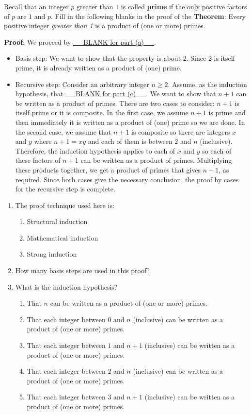 
Recall that an integer $p$ greater than $1$ is called {\bf prime} if the only positive factors of 
$p$ are $1$ and $p$. Fill in the following blanks in the proof of the {\bf Theorem}: 
Every positive integer {\it greater than 1} is a product of (one or more) primes.

{\bf Proof}: We proceed by \underline{~~~BLANK for part (a)~~~}.
\begin{itemize}
\item[] Basis step: We want to show that the property is about $2$. Since $2$ is itself prime,
it is already written as a product of (one) prime.
\item[] Recursive step: Consider an arbitrary integer $n \geq 2$.  Assume, as the induction hypothesis,
that \underline{~~~BLANK for part (c)~~~}. We want to show that $n+1$ can be written 
as a product of primes.  There are two cases to consider: $n+1$ is itself prime or it is composite.
In the first case, we assume $n+1$ is prime and then immediately it is written as a product
of (one) prime so we are done.  In the second case, we assume that $n+1$ is composite
so there are integers $x$ and $y$ where $n+1 = xy$ and each of them is between $2$ and $n$
(inclusive).  Therefore, the induction hypothesis applies to each of $x$ and $y$ so each 
of these factors of $n+1$ can be written as a product of primes.  Multiplying these products together, 
we get a product of primes that gives $n+1$, as required.  Since both cases give the necessary
conclusion, the proof by cases for the recursive step is complete.
\end{itemize}
\begin{enumerate}
\item  The proof technique used here is:
    \begin{enumerate}
        \item Structural induction
        \item Mathematical induction
        \item Strong induction
    \end{enumerate}
\item How many basis steps are used in this proof?
\newpage
\item What is the induction hypothesis?
\begin{enumerate}
\item That $n$ can be written as a product of (one or more) primes.
\item That each integer between $0$ and $n$ (inclusive) can be written as a product of (one or more) primes.
\item That each integer between $1$ and $n+1$ (inclusive) can be written as a product of (one or more) primes.
\item That each integer between $2$ and $n$ (inclusive) can be written as a product of (one or more) primes.
\item That each integer between $3$ and $n+1$ (inclusive) can be written as a product of (one or more) primes.
\end{enumerate}
\end{enumerate}
